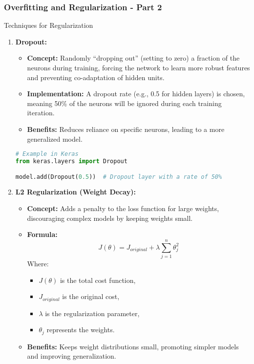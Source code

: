 \documentclass{beamer}
\begin{document}
\begin{frame}[fragile]
    \frametitle{Overfitting and Regularization - Part 2}
    \begin{block}{Techniques for Regularization}
        \begin{enumerate}
            \item \textbf{Dropout:}
            \begin{itemize}
                \item \textbf{Concept:} Randomly “dropping out” (setting to zero) a fraction of the neurons during training, forcing the network to learn more robust features and preventing co-adaptation of hidden units.
                \item \textbf{Implementation:} A dropout rate (e.g., 0.5 for hidden layers) is chosen, meaning 50\% of the neurons will be ignored during each training iteration.
                \item \textbf{Benefits:} Reduces reliance on specific neurons, leading to a more generalized model.
            \end{itemize}

            \begin{lstlisting}[language=Python]
# Example in Keras
from keras.layers import Dropout

model.add(Dropout(0.5))  # Dropout layer with a rate of 50%
            \end{lstlisting}

            \item \textbf{L2 Regularization (Weight Decay):}
            \begin{itemize}
                \item \textbf{Concept:} Adds a penalty to the loss function for large weights, discouraging complex models by keeping weights small.
                \item \textbf{Formula:} 
                \begin{equation}
                J(\theta) = J_{original} + \lambda \sum_{j=1}^{n} \theta_j^2
                \end{equation}
                Where:
                \begin{itemize}
                    \item \( J(\theta) \) is the total cost function, 
                    \item \( J_{original} \) is the original cost,
                    \item \( \lambda \) is the regularization parameter,
                    \item \( \theta_j \) represents the weights.
                \end{itemize}
                \item \textbf{Benefits:} Keeps weight distributions small, promoting simpler models and improving generalization.
            \end{itemize}
        \end{enumerate}
    \end{block}
\end{frame}
\end{document}
